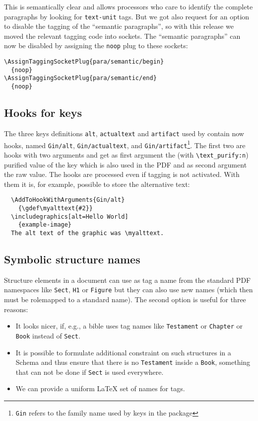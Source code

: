 \documentclass{ltnews}
\begin{document}
This is semantically clear and allows processors who care to identify
the complete paragraphs by looking for \texttt{text-unit} tags. 
But we got also request for an option to disable the tagging of the 
\enquote{semantic paragraphs}, so with this release we moved the relevant tagging 
code into sockets. The \enquote{semantic paragraphs} can now be disabled by 
assigning the \texttt{noop} plug to these sockets:
\begin{verbatim}
\AssignTaggingSocketPlug{para/semantic/begin}
  {noop}
\AssignTaggingSocketPlug{para/semantic/end}
  {noop}
\end{verbatim}

\subsection{Hooks for  keys}

The three keys definitions \texttt{alt}, \texttt{actualtext} and
\texttt{artifact} used by  contain now hooks,
named \texttt{Gin/alt}, \texttt{Gin/actualtext}, and
\texttt{Gin/artifact}\footnote{\texttt{Gin} refers to the family name
used by keys in the  package}.  The first two are hooks
with two arguments and get as first argument the (with
\verb+\text_purify:n+) purified value of the key which is also used in
the PDF and as second argument the raw value.  The hooks are processed
even if tagging is not activated.  With them it is, for example,
possible to store the alternative text:
\begin{verbatim}
  \AddToHookWithArguments{Gin/alt}
    {\gdef\myalttext{#2}}
  \includegraphics[alt=Hello World]
    {example-image}
  The alt text of the graphic was \myalttext.
\end{verbatim}


\subsection{Symbolic structure names}

 Structure elements in a document can use as tag a name from the standard PDF namespaces 
 like \verb|Sect|, \verb|H1| or \verb|Figure| but they can also use new names 
 (which then must be rolemapped to a standard name). The second option is useful for three reasons:
  \begin{itemize}
  \item It looks nicer, if, e.g., a bible uses tag names like \texttt{Testament} or 
  \texttt{Chapter} or \texttt{Book} instead of \texttt{Sect}.
  \item It is possible to formulate additional constraint on such structures in a Schema  and thus ensure that there is no \texttt{Testament} inside a \texttt{Book},  something that can not be done if \texttt{Sect} is used everywhere.
  \item We can provide a uniform LaTeX set of names for tags.
  \end{itemize}
  
\end{document}

